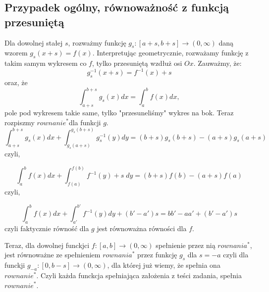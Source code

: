 \documentclass{article}
\def\rw{$rownanie^*$}
\begin{document}
\subsection*{Przypadek ogólny, równoważność z funkcją przesuniętą}
Dla dowolnej stałej $s$, rozważmy funkcję $g_s:[a+s,b+s] \to (0, \infty)$ daną wzorem $g_s(x+s) = f(x)$. \newline
Interpretując geometrycznie, rozważamy funkcję z takim samym wykresem co $f$, tylko przesuniętą wzdłuż osi $Ox$. \newline 
Zauważmy, że:
$$g_s^{-1}(x+s) = f^{-1}(x) + s$$
oraz, że
$$\int_{a+s}^{b+s}g_s(x)dx = \int_a^bf(x)dx,$$
pole pod wykresem takie same, tylko "przesuneliśmy" wykres na bok. \newline
\newline
Teraz rozpiszmy \rw dla funkcji $g$.
$$\int_{a+s}^{b+s}g_s(x)dx + \int_{g_s(a+s)}^{g_s(b+s)}g_s^{-1}(y)dy = (b+s)g_s(b+s)-(a+s)g_s(a+s)$$
czyli,

$$\int_a^bf(x)dx + \int_{f(a)}^{f(b)}f^{-1}(y)+s \;dy = (b+s)f(b) - (a+s)f(a)$$
czyli, 

$$\int_a^bf(x)dx + \int_{a'}^{b'}f^{-1}(y)dy + (b'-a')s = bb'-aa' + (b'-a')s$$
czyli faktycznie równość dla $g$ jest równoważna równości dla $f$. \newline

Teraz, dla dowolnej funckjci $f:[a,b] \to (0,\infty)$ spełnienie przez nią $rownania^*$, jest równoważne ze spełnieniem $rownania^*$ przez funkcję $g_{s}$ dla $s=-a$ czyli dla funckji $g_{-a}:[0,b-s] \to (0, \infty)$, dla której już wiemy, że spełnia ona \rw. Czyli każda funckcja spełniająca założenia z teści zadania, spełnia \rw.
\end{document}
